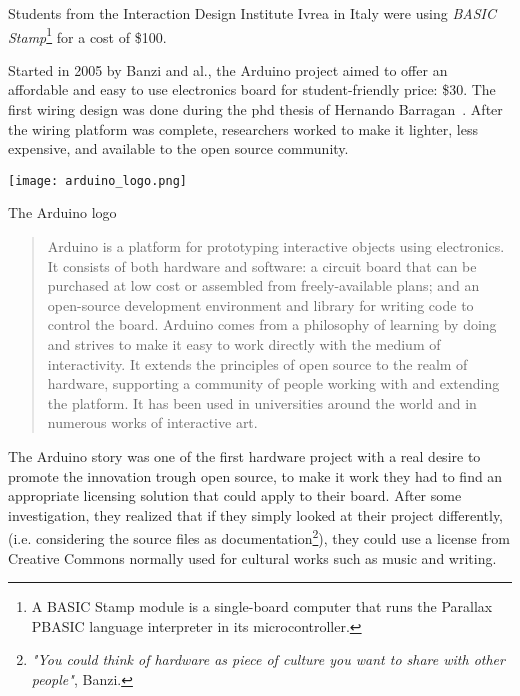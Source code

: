 Students from the Interaction Design Institute Ivrea in Italy were using \emph{BASIC Stamp}\footnote{A BASIC Stamp module is a single-board computer that runs the Parallax PBASIC language interpreter in its microcontroller.} for a cost of \$100.

\begin{row}{4}{2}
    \begin{cell}{3}
      Started in 2005 by Banzi and al., the Arduino project aimed to offer an affordable and easy to use electronics board for student-friendly price: \$30. The first wiring design was done during the phd thesis of Hernando Barragan~\cite{barragan2004wiring}. After the wiring platform was complete, researchers worked to make it lighter, less expensive, and available to the open source community.
    \end{cell}
    \begin{cell}{1}
        \begin{NFfigure}
            \centering
                \texttt{[image: arduino\_logo.png]}
            \caption{The Arduino logo}
            \label{fig:arduino_logo}
        \end{NFfigure}
    \end{cell}
\end{row}

\begin{quotation}
  Arduino is a platform for prototyping interactive objects using electronics. It consists of both hardware and software: a circuit board that can be purchased at low cost or assembled from freely-available plans; and an open-source development environment and library for writing code to control the board. Arduino comes from a philosophy of learning by doing and strives to make it easy to work directly with the medium of interactivity. It extends the principles of open source to the realm of hardware, supporting a community of people working with and extending the platform. It has been used in universities around the world and in numerous works of interactive art.

\end{quotation}

The Arduino story was one of the first hardware project with a real desire to promote the innovation trough open source, to make it work they had to find an appropriate licensing solution that could apply to their board. After some investigation, they realized that if they simply looked at their project differently, (i.e. considering the source files as documentation\footnote{\emph{"You could think of hardware as piece of culture you want to share with other people"}, Banzi. }), they could use a license from Creative Commons normally used for cultural works such as music and writing.

